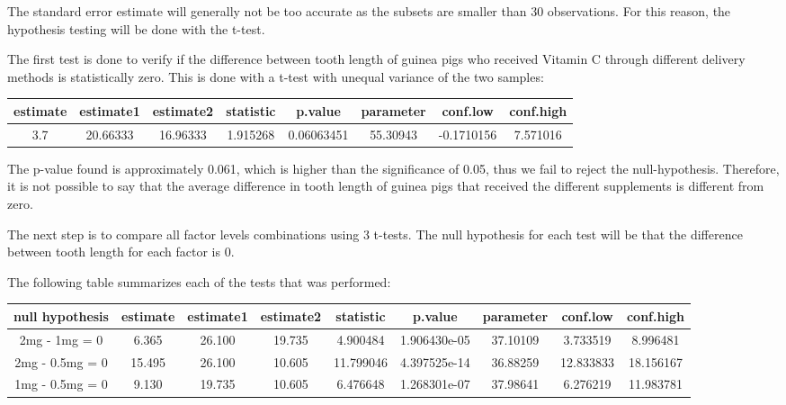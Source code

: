 \documentclass[a4paper]{article}
\begin{document}
The standard error estimate will generally not be too accurate as the subsets are smaller than 30 observations. For this reason, the hypothesis testing will be done with the t-test.

The first test is done to verify if the difference between tooth length of guinea pigs who received Vitamin C through different delivery methods is statistically zero. This is done with a t-test with unequal variance of the two samples:

\begin{small}
\begin{flushleft}
\begin{tabular}{|c|c|c|c|c|c|c|c|}
\hline
estimate & estimate1 & estimate2 & statistic & p.value & parameter & conf.low & conf.high \\ \hline
3.7 & 20.66333 & 16.96333 & 1.915268 & 0.06063451 & 55.30943 & -0.1710156 &  7.571016 \\
\hline
\end{tabular}
\end{flushleft}
\end{small}

The p-value found is approximately 0.061, which is higher than the significance of 0.05, thus we fail to reject the null-hypothesis. Therefore, it is not possible to say that the average difference in tooth length of guinea pigs that received the different supplements is different from zero.

The next step is to compare all factor levels combinations using 3 t-tests. The null hypothesis for each test will be that the difference between tooth length for each factor is 0.

The following table summarizes each of the tests that was performed:

\begin{small}
\begin{adjustwidth}{-1.5cm}{0.5cm}
\begin{flushleft}
\begin{tabular}{|c|c|c|c|c|c|c|c|c|}
\hline
null hypothesis & estimate & estimate1 & estimate2 & statistic & p.value & parameter & conf.low & conf.high \\ \hline
2mg - 1mg = 0 & 6.365 & 26.100 & 19.735 & 4.900484 & 1.906430e-05 & 37.10109 & 3.733519 & 8.996481 \\ \hline
2mg - 0.5mg = 0 & 15.495 & 26.100 & 10.605 & 11.799046 & 4.397525e-14 & 36.88259 & 12.833833 & 18.156167 \\ \hline
1mg - 0.5mg = 0 & 9.130 & 19.735 & 10.605 & 6.476648 & 1.268301e-07 & 37.98641 & 6.276219 & 11.983781 \\
\hline
\end{tabular}
\end{flushleft}
\end{adjustwidth}
\end{small}
\end{document}
